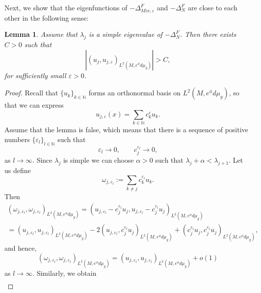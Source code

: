 \documentclass[12pt,a4paper]{amsart}
\numberwithin{equation}{section}
\theoremstyle{plain}
\newtheorem{lemma}[theorem]{Lemma}
\theoremstyle{definition}
\begin{document}
Next, we show that the eigenfunctions of $-\Delta_{Mix,\varepsilon}^F$ and $-\Delta_N^F$ are close to each other in the following sense:
\begin{lemma}\label{ef}
	Assume that $\lambda_{j}$ is a simple eigenvalue of $-\Delta_N^F$. Then there exists $C>0$ such that
	\begin{equation*}
		\left|(u_j,u_{j, \varepsilon})_{L^2(M,e^\phi d\mu_g)}\right|>C,
	\end{equation*}
	for sufficiently small $\varepsilon>0$.
\end{lemma}
\begin{proof}
	Recall that $\{u_k\}_{k\in \mathbb{N}}$ forms an orthonormal basis on $L^2(M,e^\phi d\mu_g)$, so that we can express
	\begin{equation*}
		u_{j,\varepsilon}(x) = \sum_{k\in\mathbb{N}} c_k^\varepsilon u_k.
	\end{equation*}
	Assume that the lemma is false, which means that there is a sequence of positive numbers $\{\varepsilon_l\}_{l\in \mathbb{N}}$ such that 
	\begin{equation}\label{assumpepsilon}
		\varepsilon_l \rightarrow 0, \qquad c_j^{\varepsilon_l} \rightarrow 0,
	\end{equation}
	as $l\rightarrow\infty$. Since $\lambda_j$ is simple we can choose $\alpha>0$ such that $\lambda_j + \alpha < \lambda_{j+1}$.  Let us define
	\begin{equation*}
		\omega_{j,\varepsilon_l} := \sum_{k\neq j} c_k^{\varepsilon_l} u_k.
	\end{equation*}
    Then
    \begin{multline*}
        (\omega_{j,\varepsilon_l} , \omega_{j,\varepsilon_l} )_{L^2(M,e^\phi d\mu_g)} = (u_{j,\varepsilon_l} - c_j^{\varepsilon_l}u_j, u_{j,\varepsilon_l} - c_j^{\varepsilon_l}u_j)_{L^2(M,e^\phi d\mu_g)}\\
        =(u_{j,\varepsilon_l}, u_{j,\varepsilon_l})_{L^2(M,e^\phi d\mu_g)} - 2(u_{j,\varepsilon_l} , c_j^{\varepsilon_l}u_j)_{L^2(M,e^\phi d\mu_g)} + (c_j^{\varepsilon_l}u_j, c_j^{\varepsilon_l}u_j)_{L^2(M,e^\phi d\mu_g)},
    \end{multline*}
    and hence,
    \begin{equation*}
        (\omega_{j,\varepsilon_l} , \omega_{j,\varepsilon_l} )_{L^2(M,e^\phi d\mu_g)} = (u_{j,\varepsilon_l}, u_{j,\varepsilon_l})_{L^2(M,e^\phi d\mu_g)} + o(1)
    \end{equation*}
    as $l\rightarrow\infty$. Similarly, we obtain
    \begin{multline}\label{quad_form_omega}

\end{multline}
\end{proof}
\end{document}
